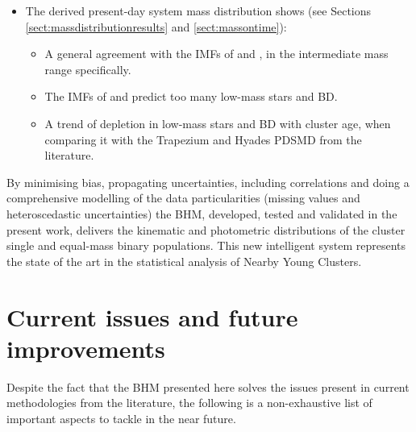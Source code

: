 \begin{itemize}
\begin{itemize}
\end{itemize}
\item The derived present-day system mass distribution \cite[using an age of 120 Myr and the BT-Settl isochrone model of][]{Allard2012} shows (see Sections \ref{sect:massdistributionresults} and \ref{sect:massontime}):
\begin{itemize}
\item A general agreement with the IMFs of \citet{Chabrier2005} and \citet{Thies2007}, in the intermediate mass range specifically.
\item The IMFs of \citet{Chabrier2005} and \citet{Thies2007} predict too many low-mass stars and BD.
\item A trend of depletion in low-mass stars and BD with cluster age, when comparing it with the Trapezium and Hyades PDSMD from the literature.
\end{itemize}
\end{itemize}

By minimising bias, propagating uncertainties, including correlations and doing a comprehensive modelling of the data particularities (missing values and heteroscedastic uncertainties) the BHM, developed, tested and validated in the present work, delivers the kinematic and photometric distributions of the cluster single and equal-mass binary populations. This new intelligent system represents the state of the art in the statistical analysis of Nearby Young Clusters.

\section{Current issues and future improvements}

Despite the fact that the BHM presented here solves the issues present in current methodologies from the literature, the following is a non-exhaustive list of important aspects to tackle in the near future.

